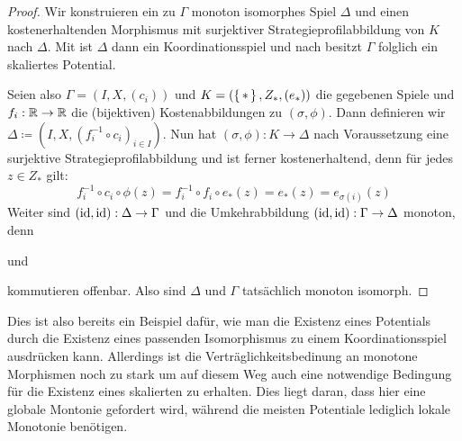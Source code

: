 \begin{proof}
	Wir konstruieren ein zu $\Gamma$ monoton isomorphes Spiel $\Delta$ und einen kostenerhaltenden Morphismus mit surjektiver Strategieprofilabbildung von $K$ nach $\Delta$. Mit  ist $\Delta$ dann ein Koordinationsspiel und nach  besitzt $\Gamma$ folglich ein skaliertes Potential.
	
	
	Seien also $\Gamma = (I, X, (c_i))$  und $K = (\set{\ast}, Z_\ast, (e_\ast))$ die gegebenen Spiele und $f_i: \mathbb{R} \to \mathbb{R}$ die (bijektiven) Kostenabbildungen zu $(\sigma, \phi)$. Dann definieren wir $\Delta \coloneqq (I, X, (f_i^{-1}\circ c_i)_{i \in I})$. Nun hat $(\sigma, \phi): K \to \Delta$ nach Voraussetzung eine surjektive Strategieprofilabbildung und ist ferner kostenerhaltend, denn für jedes $z \in Z_\ast$ gilt:
		\[f_i^{-1}\circ c_i \circ \phi(z) = f_i^{-1} \circ f_i \circ e_\ast(z) = e_\ast(z) = e_{\sigma(i)}(z) \]
	Weiter sind $(\mathrm{id}, \mathrm{id}): \Delta \to \Gamma$ und die Umkehrabbildung $(\mathrm{id}, \mathrm{id}): \Gamma \to \Delta$ monoton, denn
	\begin{center}
			und
	\end{center}		
	kommutieren offenbar. Also sind $\Delta$ und $\Gamma$ tatsächlich monoton isomorph.
\end{proof}

Dies ist also bereits ein Beispiel dafür, wie man die Existenz eines Potentials durch die Existenz eines passenden Isomorphismus zu einem Koordinationsspiel ausdrücken kann. Allerdings ist die Verträglichkeitsbedinung an monotone Morphismen noch zu stark um auf diesem Weg auch eine notwendige Bedingung für die Existenz eines skalierten zu erhalten. Dies liegt daran, dass hier eine globale Montonie gefordert wird, während die meisten Potentiale lediglich lokale Monotonie benötigen.

